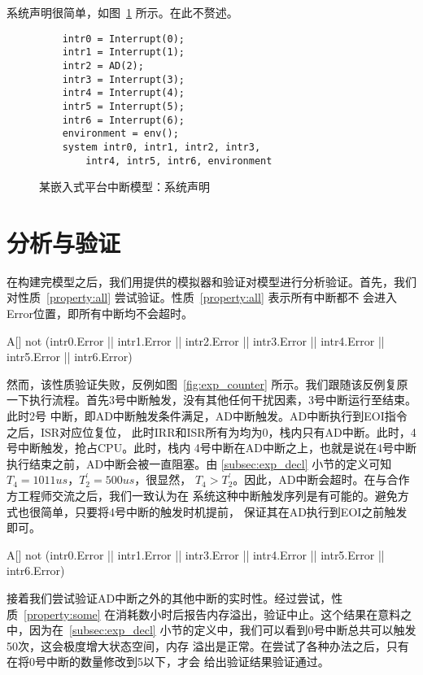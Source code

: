 系统声明很简单，如图~\ref{fig:exp_model_decl} 所示。在此不赘述。

\begin{figure}[H]
	\centering
	\begin{lstlisting}
	intr0 = Interrupt(0);
	intr1 = Interrupt(1);
	intr2 = AD(2);
	intr3 = Interrupt(3);
	intr4 = Interrupt(4);
	intr5 = Interrupt(5);
	intr6 = Interrupt(6);
	environment = env();
	system intr0, intr1, intr2, intr3, 
		intr4, intr5, intr6, environment
	\end{lstlisting}
	\caption{某嵌入式平台中断模型：系统声明}
	\label{fig:exp_model_decl}
\end{figure}

\section{分析与验证}
\label{sec:experiment}

在构建完模型之后，我们用\uppaal 提供的模拟器和验证对模型进行分析验证。首先，我们
对性质~\ref{property:all} 尝试验证。性质~\ref{property:all} 表示所有中断都不
会进入Error位置，即所有中断均不会超时。

\begin{property}
	A[] not (intr0.Error || intr1.Error || intr2.Error || intr3.Error 
	|| intr4.Error || intr5.Error || intr6.Error) 
	\label{property:all}
\end{property}

然而，该性质验证失败，反例如图~\ref{fig:exp_counter} 所示。我们跟随该反例复原
一下执行流程。首先3号中断触发，没有其他任何干扰因素，3号中断运行至结束。此时2号
中断，即AD中断触发条件满足，AD中断触发。AD中断执行到EOI指令之后，ISR对应位复位，
此时IRR和ISR所有为均为0，栈内只有AD中断。此时，4号中断触发，抢占CPU。此时，栈内
4号中断在AD中断之上，也就是说在4号中断执行结束之前，AD中断会被一直阻塞。由
\ref{subsec:exp_decl} 小节的定义可知$T_4=1011us$，$T^\prime_2=500us$，很显然，
$T_4>T^\prime_2$。因此，AD中断会超时。在与合作方工程师交流之后，我们一致认为在
系统这种中断触发序列是有可能的。避免方式也很简单，只要将4号中断的触发时机提前，
保证其在AD执行到EOI之前触发即可。

\begin{property}
	A[] not (intr0.Error || intr1.Error || intr3.Error || intr4.Error || 
	intr5.Error || intr6.Error) 
	\label{property:some}
\end{property}

接着我们尝试验证AD中断之外的其他中断的实时性。经过尝试，性质~\ref{property:some}
在消耗数小时后报告内存溢出，验证中止。这个结果在意料之中，因为在~\ref{subsec:exp_decl} 
小节的定义中，我们可以看到0号中断总共可以触发50次，这会极度增大状态空间，内存
溢出是正常。在尝试了各种办法之后，只有在将0号中断的数量修改到5以下，\uppaal 才会
给出验证结果\pozhehao 验证通过。

